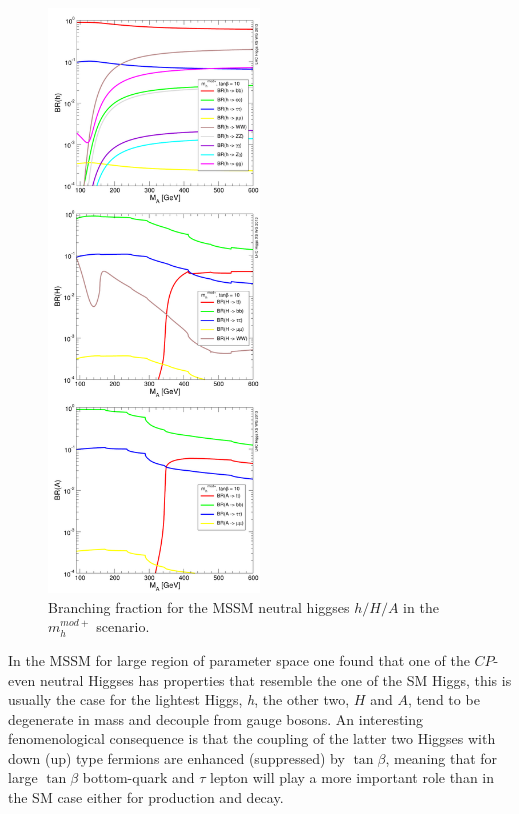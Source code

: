 \begin{figure}[tp]
     \begin{center}

            \includegraphics[width=0.5\textwidth]{figure/br.png}

    \end{center}
    \caption{Branching fraction for the MSSM neutral higgses $h/H/A$ in the $m_h^{mod+}$ scenario.}
   \label{fig:br}

\end{figure}

In the MSSM for large region of parameter space one found that one of the 
$CP$-even neutral Higgses  has properties that resemble the one of the SM Higgs,
this is usually the case for the lightest Higgs, \emph{h}, the other two, $H$ and $A$, 
tend to be degenerate in mass and decouple from gauge bosons.
An interesting fenomenological consequence is that the coupling of the latter
two Higgses with down (up) type fermions are enhanced
(suppressed) by $\tan\beta$, meaning that for large $\tan\beta$
bottom-quark and $\tau$ lepton will play a more important role than in
the SM case either for production and decay.

